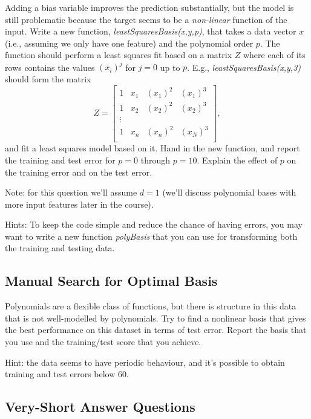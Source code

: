 \documentclass{article}
\def\blu#1{{\color{blu}#1}}
\begin{document}
Adding a bias variable improves the prediction substantially, but the model is still problematic because the target seems to be a \emph{non-linear} function of the input. Write a new function, \emph{leastSquaresBasis(x,y,p)}, that takes a data vector $x$ (i.e., assuming we only have one feature) and the polynomial order $p$. The function should perform a least squares fit based on a matrix $Z$ where each of its rows contains the values $(x_{i})^j$ for $j=0$ up to $p$. E.g., \emph{leastSquaresBasis(x,y,3)} should form the matrix
\[
Z = 
\left[\begin{array}{cccc}
1 & x_1 & (x_1)^2 & (x_1)^3\\
1 & x_2 & (x_2)^2 & (x_2)^3\\
\vdots\\
1 & x_n & (x_n)^2 & (x_N)^3\\
\end{array}
\right],
\]
and fit a least squares model based on it.
\blu{Hand in the new function, and report the training and test error for $p = 0$ through $p= 10$. Explain the effect of $p$ on the training error and on the test error.}

Note: for this question we'll assume $d=1$ (we'll discuss polynomial bases with more input features later in the course).

Hints: To keep the code simple and reduce the chance of having errors, you may want to write a new function \emph{polyBasis} that you can use for transforming both the training and testing data. 



\subsection{Manual Search for Optimal Basis}

Polynomials are a flexible class of functions, but there is structure in this data that is not well-modelled by polynomials. Try to find a nonlinear basis that gives the best performance on this dataset in terms of test error. \blu{Report the basis that you use and the training/test score that you achieve}.

Hint: the data seems to have periodic behaviour, and it's possible to obtain training and test errors below 60.



\subsection{Very-Short Answer Questions}
\end{document}
